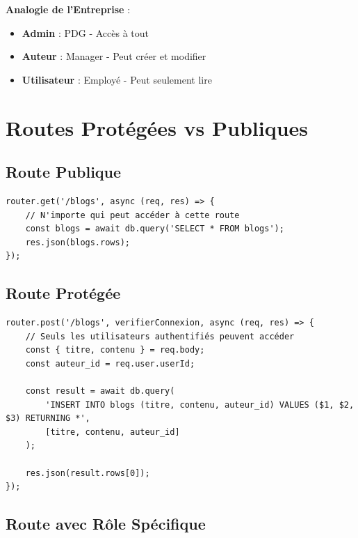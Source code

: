\begin{analogybox}
    \textbf{Analogie de l'Entreprise} :
    \begin{itemize}
        \item \textbf{Admin} : PDG - Accès à tout
        \item \textbf{Auteur} : Manager - Peut créer et modifier
        \item \textbf{Utilisateur} : Employé - Peut seulement lire
    \end{itemize}
\end{analogybox}

\section{Routes Protégées vs Publiques}

\subsection{Route Publique}

\begin{lstlisting}[style=javascript, caption=Route publique (sans authentification)]
router.get('/blogs', async (req, res) => {
    // N'importe qui peut accéder à cette route
    const blogs = await db.query('SELECT * FROM blogs');
    res.json(blogs.rows);
});
\end{lstlisting}

\subsection{Route Protégée}

\begin{lstlisting}[style=javascript, caption=Route protégée (avec authentification)]
router.post('/blogs', verifierConnexion, async (req, res) => {
    // Seuls les utilisateurs authentifiés peuvent accéder
    const { titre, contenu } = req.body;
    const auteur_id = req.user.userId;
    
    const result = await db.query(
        'INSERT INTO blogs (titre, contenu, auteur_id) VALUES ($1, $2, $3) RETURNING *',
        [titre, contenu, auteur_id]
    );
    
    res.json(result.rows[0]);
});
\end{lstlisting}

\subsection{Route avec Rôle Spécifique}

